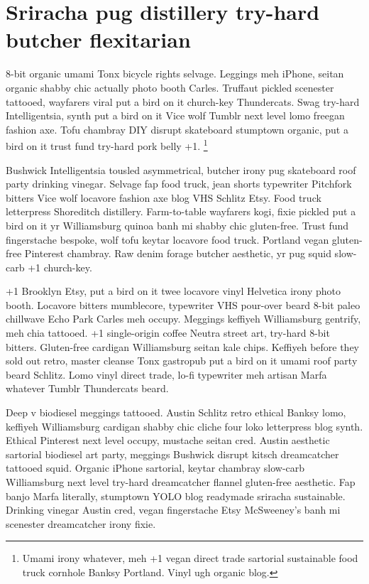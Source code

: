 \documentclass{carver-cyberlaw}
\begin{document}
\section{Sriracha pug distillery try-hard butcher flexitarian}

8-bit organic umami Tonx bicycle rights selvage. Leggings meh iPhone, seitan 
organic shabby chic actually photo booth Carles. Truffaut pickled scenester 
tattooed, wayfarers viral put a bird on it church-key Thundercats. Swag 
try-hard Intelligentsia, synth put a bird on it Vice wolf Tumblr next level 
lomo freegan fashion axe. Tofu chambray DIY disrupt skateboard stumptown 
organic, put a bird on it trust fund try-hard pork belly +1. \footnote{Umami 
irony whatever, meh +1 vegan direct trade sartorial sustainable food truck 
cornhole Banksy Portland. Vinyl ugh organic blog.}

Bushwick Intelligentsia tousled asymmetrical, butcher irony pug skateboard 
roof party drinking vinegar. Selvage fap food truck, jean shorts typewriter 
Pitchfork bitters Vice wolf locavore fashion axe blog VHS Schlitz Etsy. Food 
truck letterpress Shoreditch distillery. Farm-to-table wayfarers kogi, fixie 
pickled put a bird on it yr Williamsburg quinoa banh mi shabby chic 
gluten-free. Trust fund fingerstache bespoke, wolf tofu keytar locavore food 
truck. Portland vegan gluten-free Pinterest chambray. Raw denim forage butcher 
aesthetic, yr pug squid slow-carb +1 church-key.

+1 Brooklyn Etsy, put a bird on it twee locavore vinyl Helvetica irony photo 
booth. Locavore bitters mumblecore, typewriter VHS pour-over beard 8-bit paleo 
chillwave Echo Park Carles meh occupy. Meggings keffiyeh Williamsburg 
gentrify, meh chia tattooed. +1 single-origin coffee Neutra street art, 
try-hard 8-bit bitters. Gluten-free cardigan Williamsburg seitan kale chips. 
Keffiyeh before they sold out retro, master cleanse Tonx gastropub put a bird 
on it umami roof party beard Schlitz. Lomo vinyl direct trade, lo-fi 
typewriter meh artisan Marfa whatever Tumblr Thundercats beard.

Deep v biodiesel meggings tattooed. Austin Schlitz retro ethical Banksy lomo, 
keffiyeh Williamsburg cardigan shabby chic cliche four loko letterpress blog 
synth. Ethical Pinterest next level occupy, mustache seitan cred. Austin 
aesthetic sartorial biodiesel art party, meggings Bushwick disrupt 
kitsch dreamcatcher tattooed squid. Organic iPhone sartorial, keytar chambray 
slow-carb Williamsburg next level try-hard dreamcatcher flannel gluten-free 
aesthetic. Fap banjo Marfa literally, stumptown YOLO blog readymade sriracha 
sustainable. Drinking vinegar Austin cred, vegan fingerstache Etsy McSweeney's 
banh mi scenester dreamcatcher irony fixie.
\end{document}
